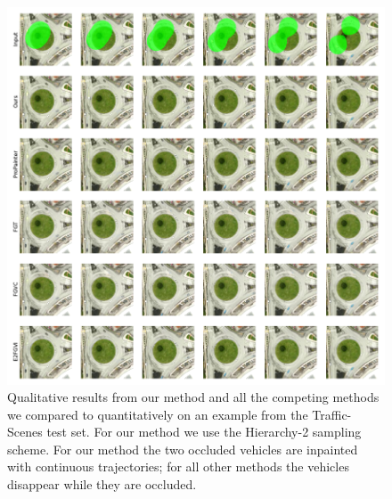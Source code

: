 \begin{figure}[h]
\begin{center}
    \centering
    \captionsetup{type=figure}
    \includegraphics[width=\linewidth]{figures/additional-samples/ts1.pdf}
    \caption{Qualitative results from our method and all the competing methods we compared to quantitatively on an example from the Traffic-Scenes test set. For our method we use the Hierarchy-2 sampling scheme. For our method the two occluded vehicles are inpainted with continuous trajectories; for all other methods the vehicles disappear while they are occluded.} 
    \label{fig:ts1}
\end{center}
\end{figure}

